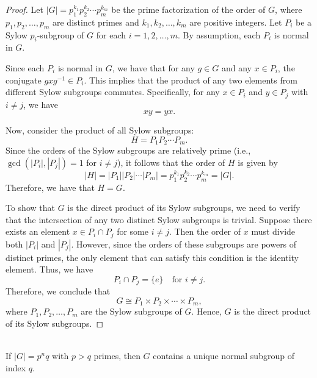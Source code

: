 \documentclass{article}
\begin{document}
\begin{proof}
    Let $|G| = p_1^{k_1} p_2^{k_2} \cdots p_m^{k_m}$ be the prime factorization of the order of $G$, where $p_1, p_2, \ldots, p_m$ are distinct primes and $k_1, k_2, \ldots, k_m$ are positive integers. Let $P_i$ be a Sylow $p_i$-subgroup of $G$ for each $i = 1, 2, \ldots, m$. By assumption, each $P_i$ is normal in $G$.

    Since each $P_i$ is normal in $G$, we have that for any $g \in G$ and any $x \in P_i$, the conjugate $g x g^{-1} \in P_i$. This implies that the product of any two elements from different Sylow subgroups commutes. Specifically, for any $x \in P_i$ and $y \in P_j$ with $i \neq j$, we have
    \[
        xy = yx.
    \]

    Now, consider the product of all Sylow subgroups:
    \[
        H = P_1 P_2 \cdots P_m.
    \]
    Since the orders of the Sylow subgroups are relatively prime (i.e., $\gcd(|P_i|, |P_j|) = 1$ for $i \neq j$), it follows that the order of $H$ is given by
    \[
        |H| = |P_1| |P_2| \cdots |P_m| = p_1^{k_1} p_2^{k_2} \cdots p_m^{k_m} = |G|.
    \]
    Therefore, we have that $H = G$.

    To show that $G$ is the direct product of its Sylow subgroups, we need to verify that the intersection of any two distinct Sylow subgroups is trivial. Suppose there exists an element $x \in P_i \cap P_j$ for some $i \neq j$. Then the order of $x$ must divide both $|P_i|$ and $|P_j|$. However, since the orders of these subgroups are powers of distinct primes, the only element that can satisfy this condition is the identity element. Thus, we have
    \[
        P_i \cap P_j = \{e\} \quad \text{for } i \neq j.
    \]
    Therefore, we conclude that
    \[
        G \cong P_1 \times P_2 \times \cdots \times P_m,
    \]
    where $P_1, P_2, \ldots, P_m$ are the Sylow subgroups of $G$. Hence, $G$ is the direct product of its Sylow subgroups.
\end{proof}


\begin{problem}[II.5.9] \\ 
    If $|G| = p^n q$ with $p > q$ primes, then $G$ contains a unique normal subgroup of index $q$.
\end{problem}
\end{document}

